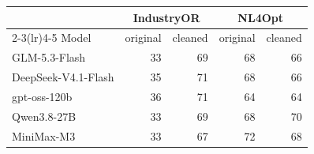 \begin{tabular}{lrrrr}
\toprule
 & \multicolumn{2}{c}{IndustryOR} & \multicolumn{2}{c}{NL4Opt} \\
\cmidrule(lr){2-3}\cmidrule(lr){4-5}
Model & original & cleaned & original & cleaned \\
\midrule
GLM-5.3-Flash & 33 & 69 & 68 & 66 \\
DeepSeek-V4.1-Flash & 35 & 71 & 68 & 66 \\
gpt-oss-120b & 36 & 71 & 64 & 64 \\
Qwen3.8-27B & 33 & 69 & 68 & 70 \\
MiniMax-M3 & 33 & 67 & 72 & 68 \\
\bottomrule
\end{tabular}
